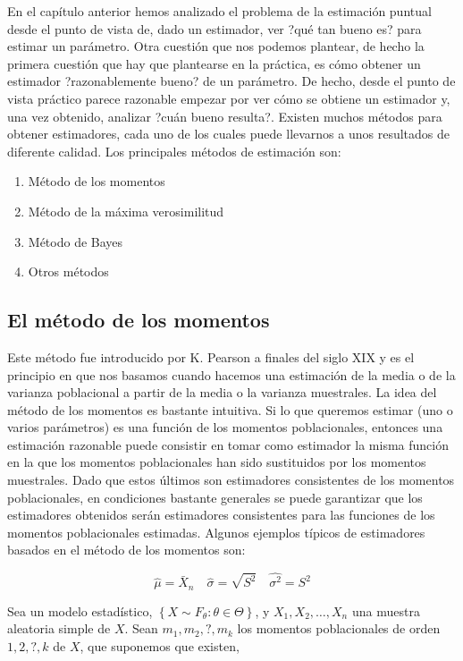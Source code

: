 \documentclass[
]{article}
\providecommand{\tightlist}{%
  \setlength{\itemsep}{0pt}\setlength{\parskip}{0pt}}
\begin{document}
En el capítulo anterior hemos analizado el problema de la estimación puntual desde el punto de vista de, dado un estimador, ver ?qué tan bueno es? para estimar un parámetro.
Otra cuestión que nos podemos plantear, de hecho la primera cuestión que hay que plantearse en la práctica, es cómo obtener un estimador ?razonablemente bueno? de un parámetro. De hecho, desde el punto de vista práctico parece razonable empezar por ver cómo se obtiene un estimador y, una vez obtenido, analizar ?cuán bueno resulta?.
Existen muchos métodos para obtener estimadores, cada uno de los cuales puede llevarnos a unos resultados de diferente calidad.
Los principales métodos de estimación son:

\begin{enumerate}
\def\labelenumi{\arabic{enumi}.}
\tightlist
\item
  Método de los momentos
\item
  Método de la máxima verosimilitud
\item
  Método de Bayes
\item
  Otros métodos
\end{enumerate}

\subsection{El método de los momentos}\label{el-muxe9todo-de-los-momentos}

Este método fue introducido por K. Pearson a finales del siglo XIX y es el principio en que nos basamos cuando hacemos una estimación de la media o de la varianza poblacional a partir de la media o la varianza muestrales.
La idea del método de los momentos es bastante intuitiva. Si lo que queremos estimar (uno o varios parámetros) es una función de los momentos
poblacionales, entonces una estimación razonable puede consistir en tomar como estimador la misma función en la que los momentos poblacionales han sido sustituidos por los momentos muestrales.
Dado que estos últimos son estimadores consistentes de los momentos poblacionales, en condiciones bastante generales se puede garantizar que los estimadores obtenidos serán estimadores consistentes para las funciones de los momentos poblacionales estimadas.
Algunos ejemplos típicos de estimadores basados en el método de los momentos son:

\[
\widehat{\mu}=\bar{X}_{n} \quad \widehat{\sigma}=\sqrt{S^{2}} \quad \widehat{\sigma^{2}}=S^{2}
\]

Sea un modelo estadístico, \(\left\{X \sim F_{\theta}: \theta \in \Theta\right\}\), y \(X_{1}, X_{2}, \ldots, X_{n}\) una muestra aleatoria simple de \(X\). Sean \(m_{1}, m_{2}, ?, m_{k}\) los momentos poblacionales de orden \(1,2, ?, k\) de \(X\), que suponemos que existen,
\end{document}
